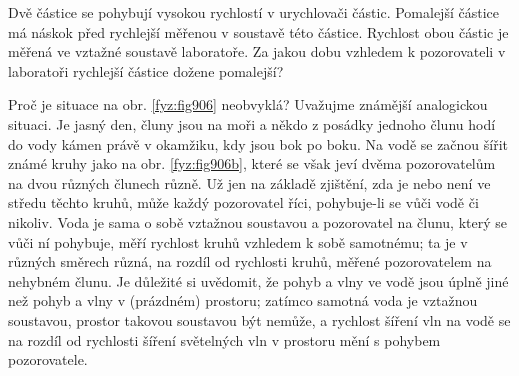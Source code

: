 \begin{mdframed}[style=mdexam]
  \begin{example}\label{fyz:fey_exam018}
    Dvě částice se pohybují vysokou rychlostí v urychlovači částic. Pomalejší částice má náskok před
    rychlejší měřenou v soustavě této částice. Rychlost obou částic je měřená ve vztažné soustavě
    laboratoře. Za jakou dobu vzhledem k pozorovateli v laboratoři rychlejší částice dožene
    pomalejší?


    Proč je situace na obr. \ref{fyz:fig906} neobvyklá? Uvažujme známější analogickou situaci. Je
    jasný den, čluny jsou na moři a někdo z posádky jednoho člunu hodí do vody kámen právě v
    okamžiku, kdy jsou bok po boku. Na vodě se začnou šířit známé kruhy jako na obr.
    \ref{fyz:fig906b}, které se však jeví dvěma pozorovatelům na dvou různých člunech různě. Už jen
    na základě zjištění, zda je nebo není ve středu těchto kruhů, může každý pozorovatel říci,
    pohybuje-li se vůči vodě či nikoliv. Voda je sama o sobě vztažnou soustavou a pozorovatel na
    člunu, který se vůči ní pohybuje, měří rychlost kruhů vzhledem k sobě samotnému; ta je v různých
    směrech různá, na rozdíl od rychlosti kruhů, měřené pozorovatelem na nehybném člunu. Je důležité
    si uvědomit, že pohyb a vlny ve vodě jsou úplně jiné než pohyb a vlny v (prázdném) prostoru;
    zatímco samotná voda je vztažnou soustavou, prostor takovou soustavou být nemůže, a rychlost
    šíření vln na vodě se na rozdíl od rychlosti šíření světelných vln v prostoru mění s pohybem
    pozorovatele.

    {\centering
    \captionsetup{type=figure}
    \par}
    \vspace{1em}

  \end{example}
\end{mdframed}